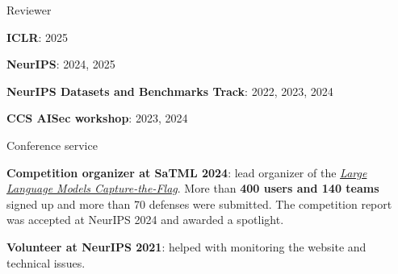 

\begin{cventries}


\cventry
{Reviewer} %
{} %
{} %
{} %
{
    \begin{cvitems} %
        \item{\textbf{ICLR}: 2025}
        \item{\textbf{NeurIPS}: 2024, 2025}
        \item{\textbf{NeurIPS Datasets and Benchmarks Track}: 2022, 2023, 2024}
        \item{\textbf{CCS AISec workshop}: 2023, 2024}
    \end{cvitems}
}

\cventry
{Conference service} %
{} %
{} %
{} %
{
    \begin{cvitems} %
        \item{\textbf{Competition organizer at SaTML 2024}: lead organizer of the \href{https://ctf.spylab.ai}{\textit{Large Language Models Capture-the-Flag}}. More than \textbf{400 users and 140 teams} signed up and more than 70 defenses were submitted. The competition report was accepted at NeurIPS 2024 and awarded a spotlight.}
        \item{\textbf{Volunteer at NeurIPS 2021}: helped with monitoring the website and technical issues.}
    \end{cvitems}
}


\end{cventries}
